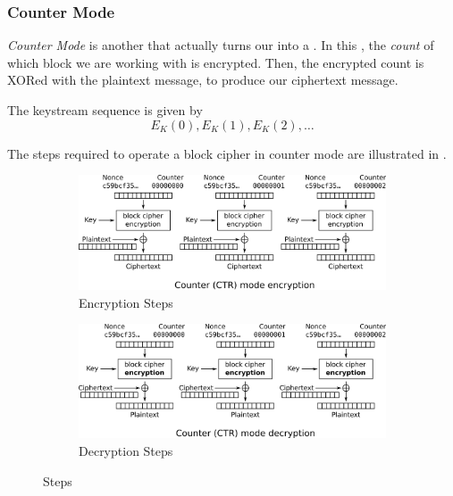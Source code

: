 \subsubsection{Counter Mode}\label{subsubsec:Counter_Mode}
\begin{definition}\label{def:Counter_Mode}
  \emph{Counter Mode} is another  that actually turns our  into a .
  In this , the \emph{count} of which block we are working with is encrypted.
  Then, the encrypted count is XORed with the plaintext message, to produce our ciphertext message.

  The keystream sequence is given by
  \begin{equation}\label{eq:Counter_Mode_Keystream_Sequence}
    E_{K}(0), E_{K}(1), E_{K}(2), \ldots
  \end{equation}
\end{definition}

The steps required to operate a block cipher in counter mode are illustrated in .
\begin{figure}[ht!]
  \centering
  \begin{subfigure}[h!]{0.45\linewidth}
    \centering
    \includegraphics[scale=0.55]{./Drawings/EDIN01-Cryptography/Counter_Mode-Encryption.png}
    \caption{ Encryption Steps}
    \label{subfig:Counter_Mode_Steps_Encryption}
  \end{subfigure}
  \vline{}
  \begin{subfigure}[h!]{0.45\linewidth}
    \centering
    \includegraphics[scale=0.55]{./Drawings/EDIN01-Cryptography/Counter_Mode-Decryption.png}
    \caption{ Decryption Steps}
    \label{subfig:Counter_Mode_Steps_Decryption}
  \end{subfigure}
  \caption{ Steps}
  \label{fig:Cipher_Block_Chaining_Mode_Steps}
\end{figure}

